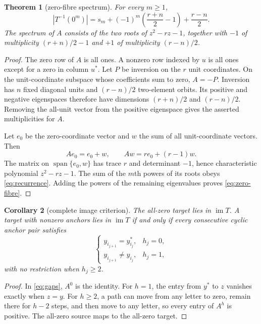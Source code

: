 \documentclass[a4paper,10pt]{amsart}
\newtheorem{theorem}{Theorem}[section]
\newtheorem{corollary}[theorem]{Corollary}
\theoremstyle{remark}
\newcommand{\im}{\operatorname{im}}
\begin{document}
\begin{theorem}[zero-fibre spectrum]\label{thm:spectrum}
For every $m\geq1$,
\begin{equation}\label{eq:zero-fibre}
 |T^{-1}(0^m)|=s_m+(-1)^m\left(\frac{r+n}{2}-1\right)
 +\frac{r-n}{2}.
\end{equation}
The spectrum of $A$ consists of the two roots of
$z^2-rz-1$, together with $-1$ of multiplicity $(r+n)/2-1$ and $+1$ of
multiplicity $(r-n)/2$.
\end{theorem}

\begin{proof}
The zero row of $A$ is all ones.  A nonzero row indexed by $u$ is all ones
except for a zero in column $u^*$.  Let $P$ be inversion on the $r$ unit
coordinates.  On the unit-coordinate subspace whose coefficients sum to
zero, $A=-P$.  Inversion has $n$ fixed diagonal units and $(r-n)/2$
two-element orbits.  Its positive and negative eigenspaces therefore have
dimensions $(r+n)/2$ and $(r-n)/2$.  Removing the all-unit vector from the
positive eigenspace gives the asserted multiplicities for $A$.

Let $e_0$ be the zero-coordinate vector and $w$ the sum of all unit-coordinate
vectors.  Then
\begin{equation*}
 A e_0=e_0+w,\qquad A w=r e_0+(r-1)w.
\end{equation*}
The matrix on $\operatorname{span}\{e_0,w\}$ has trace $r$ and determinant
$-1$, hence characteristic polynomial $z^2-rz-1$.  The sum of the $m$th
powers of its roots obeys \eqref{eq:recurrence}.  Adding the powers of the
remaining eigenvalues proves \eqref{eq:zero-fibre}.
\end{proof}

\begin{corollary}[complete image criterion]\label{cor:image}
The all-zero target lies in $\im T$.  A target with nonzero anchors lies in
$\im T$ if and only if every consecutive cyclic anchor pair satisfies
\begin{equation}\label{eq:image}
 \begin{cases}
 y_{i_{j+1}}=y_{i_j}^*,&h_j=0,\\
 y_{i_{j+1}}\ne y_{i_j},&h_j=1,
 \end{cases}
\end{equation}
with no restriction when $h_j\geq2$.
\end{corollary}

\begin{proof}
In \eqref{eq:gaps}, $A^0$ is the identity.  For $h=1$, the entry from
$y^*$ to $z$ vanishes exactly when $z=y$.  For $h\geq2$, a path can move
from any letter to zero, remain there for $h-2$ steps, and then move to any
letter, so every entry of $A^h$ is positive.  The all-zero source maps to the
all-zero target.
\end{proof}
\end{document}
